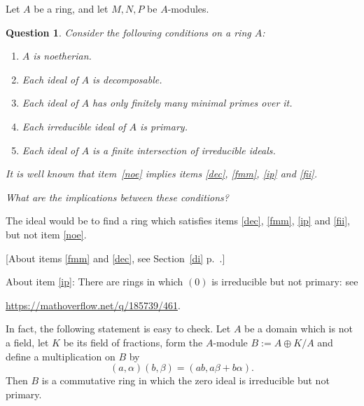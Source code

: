 \documentclass[parskip=half,fontsize=12pt]{scrartcl}%
\newtheorem{qn}[thm]{Question}
\begin{document}
Let $A$ be a ring, and let $M,N,P$ be $A$-modules.



\begin{qn}
Consider the following conditions on a ring $A$:

\begin{enumerate}
\item\label{noe} $A$ is noetherian.
\item\label{dec} Each ideal of $A$ is decomposable.
\item\label{fmm} Each ideal of $A$ has only finitely many minimal primes over it.
\item\label{ip} Each irreducible ideal of $A$ is primary.
\item\label{fii} Each ideal of $A$ is a finite intersection of irreducible ideals.
\end{enumerate}

It is well known that item~\ref{noe} implies items \ref{dec}, \ref{fmm}, \ref{ip} and \ref{fii}.%

What are the implications between these conditions?
\end{qn}

The ideal would be to find a ring which satisfies items \ref{dec}, \ref{fmm}, \ref{ip} and \ref{fii}, but not item \ref{noe}.%

[About items \ref{fmm} and \ref{dec}, see Section~\ref{di} p.~\pageref{di}.]

About item \ref{ip}: There are rings in which $(0)$ is irreducible but not primary: see 

\href{https://mathoverflow.net/q/185739/461}{https://mathoverflow.net/q/185739/461}. 

In fact, the following statement is easy to check. Let $A$ be a domain which is not a field, let $K$ be its field of fractions, form the $A$-module $B:=A\oplus K/A$ and define a multiplication on $B$ by $$(a,\alpha)(b,\beta)=(ab,a\beta+b\alpha).$$ Then $B$ is a commutative ring in which the zero ideal is irreducible but not primary.\bigskip
\end{document}
